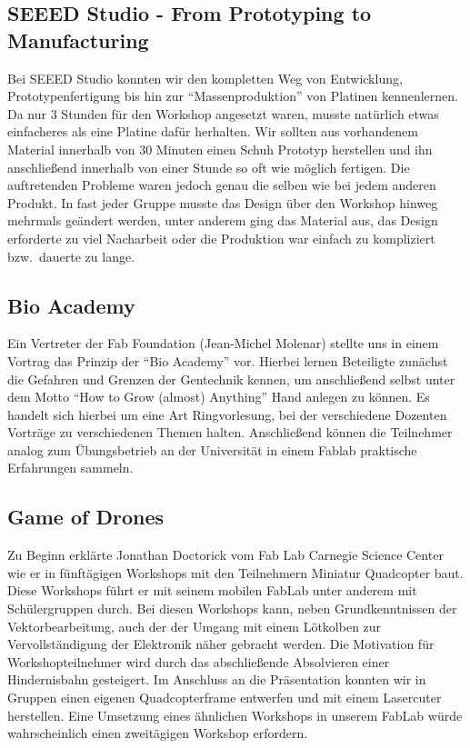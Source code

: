 \documentclass{\basedir/fablab-document}
\begin{document}
\subsection*{SEEED Studio - From Prototyping to Manufacturing}

Bei SEEED Studio konnten wir den kompletten Weg von Entwicklung,
Prototypenfertigung bis hin zur \enquote{Massenproduktion} von Platinen kennenlernen. Da
nur 3 Stunden für den Workshop angesetzt waren, musste natürlich etwas
einfacheres als eine Platine dafür herhalten. Wir sollten aus
vorhandenem Material innerhalb von 30 Minuten einen Schuh Prototyp
herstellen und ihn anschließend innerhalb von einer Stunde so oft wie
möglich fertigen. Die auftretenden Probleme waren jedoch genau die selben
wie bei jedem anderen Produkt. In fast jeder Gruppe musste das Design
über den Workshop hinweg mehrmals geändert werden, unter anderem ging
das Material aus, das Design erforderte zu viel Nacharbeit oder die
Produktion war einfach zu kompliziert bzw.\ dauerte zu lange.

\subsection*{Bio Academy}

Ein Vertreter der Fab Foundation (Jean-Michel Molenar) stellte uns in
einem Vortrag das Prinzip der \enquote{Bio Academy} vor. Hierbei lernen
Beteiligte zunächst die Gefahren und Grenzen der Gentechnik kennen, um
anschließend selbst unter dem Motto \enquote{How to Grow (almost) Anything}
Hand anlegen zu können. Es handelt sich hierbei um eine Art
Ringvorlesung, bei der verschiedene Dozenten Vorträge zu verschiedenen
Themen halten. Anschließend können die Teilnehmer analog zum
Übungsbetrieb an der Universität in einem Fablab praktische Erfahrungen
sammeln.

\subsection*{Game of Drones}

Zu Beginn erklärte Jonathan Doctorick vom Fab Lab Carnegie Science Center wie er in fünftägigen Workshops
mit den Teilnehmern Miniatur Quadcopter baut. Diese Workshops führt er
mit seinem mobilen FabLab unter anderem mit Schülergruppen durch. Bei
diesen Workshops kann, neben Grundkenntnissen der Vektorbearbeitung,
auch der der Umgang mit einem Lötkolben zur Vervollständigung der
Elektronik näher gebracht werden. Die Motivation für Workshopteilnehmer
wird durch das abschließende Absolvieren einer Hindernisbahn gesteigert.
Im Anschluss an die Präsentation konnten wir in Gruppen einen eigenen
Quadcopterframe entwerfen und mit einem Lasercuter herstellen. Eine
Umsetzung eines ähnlichen Workshops in unserem FabLab würde
wahrscheinlich einen zweitägigen Workshop erfordern.
\end{document}
